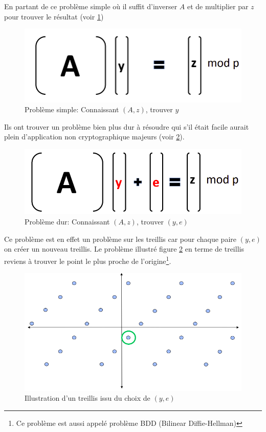 \documentclass[a4paper, 12pt]{article}
\begin{document}
En partant de ce problème simple où il suffit d'inverser $A$ et de multiplier par $z$ pour trouver le résultat (voir \ref{quantsimple})
\begin{figure}[h]
	\centering
	\includegraphics[width=\textwidth]{img/quantique_simple.png}
	\caption{Problème simple: Connaissant $(A, z)$, trouver $y$}
	\label{quantsimple}
\end{figure}

Ils ont trouver un problème bien plus dur à résoudre qui s'il était facile aurait plein d'application non cryptographique majeurs (voir \ref{quantdur}).
\begin{figure}[h]
	\centering
	\includegraphics[width=\textwidth]{img/quantique_dur.png}
	\caption{Problème dur: Connaissant $(A, z)$, trouver $(y, e)$}
	\label{quantdur}
\end{figure}
Ce problème est en effet un problème sur les treillis car pour chaque paire $(y,e)$ on créer un nouveau treillis. Le problème illustré figure \ref{quantdur} en terme de treillis reviens à trouver le point le plus proche de l'origine\footnote{Ce problème est aussi appelé problème BDD (Bilinear Diffie-Hellman)}.
\begin{figure}[h]
	\centering
	\includegraphics[width=\textwidth]{img/treilliIlu.png}
	\caption{Illustration d'un treillis issu du choix de $(y,e)$}
	\label{treilliIlu}
\end{figure}
\end{document}
